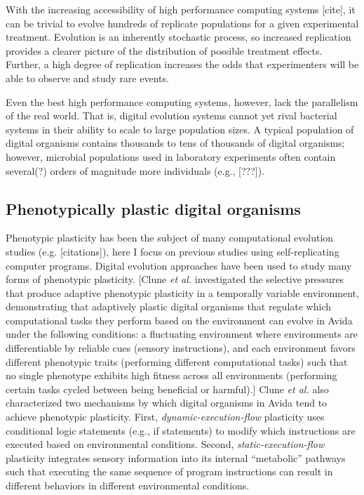 With the increasing accessibility of high performance computing systems [cite], it can be trivial to evolve hundreds of replicate populations for a given experimental treatment. 
Evolution is an inherently stochastic process, so increased replication provides a clearer picture of the distribution of possible treatment effects. 
Further, a high degree of replication increases the odds that experimenters will be able to observe and study rare events. 

Even the best high performance computing systems, however, lack the parallelism of the real world.
That is, digital evolution systems cannot yet rival bacterial systems in their ability to scale to large population sizes. 
A typical population of digital organisms contains thousands to tens of thousands of digital organisms; however, microbial populations used in laboratory experiments often contain several(?) orders of magnitude more individuals (e.g.,  [???]). 

\subsection{Phenotypically plastic digital organisms}

Phenotypic plasticity has been the subject of many computational evolution studies (e.g. [citations]), here I focus on previous studies using self-replicating computer programs. 
Digital evolution approaches have been used to study many forms of phenotypic plasticity. 
[Clune \textit{et al.} investigated the selective pressures that produce adaptive phenotypic plasticity in a temporally variable environment, demonstrating that adaptively plastic digital organisms that regulate which computational tasks they perform based on the environment can evolve in Avida under the following conditions:  
a fluctuating environment where environments are differentiable by reliable cues (sensory instructions), and each environment favors different phenotypic traits (performing different computational tasks) such that no single phenotype exhibits high fitness across all environments (performing certain tasks cycled between being beneficial or harmful).]
Clune \textit{et al.} also characterized two mechanisms by which digital organisms in Avida tend to achieve phenotypic plasticity.
First, \textit{dynamic-execution-flow} plasticity uses conditional logic statements (e.g., if statements) to modify which instructions are executed based on environmental conditions. 
Second, \textit{static-execution-flow} plasticity integrates sensory information into its internal ``metabolic'' pathways such that executing the same sequence of program instructions can result in different behaviors in different environmental conditions.

